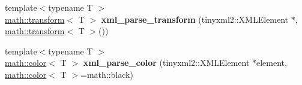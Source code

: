 \begin{DoxyCompactItemize}
\item 
\hypertarget{namespacemath_a47aa4c23b06657f4a08dc3330076a4dc}{
{\footnotesize template$<$typename T $>$ }\\\hyperlink{classmath_1_1transform}{math::transform}$<$ T $>$ {\bfseries xml\_\-parse\_\-transform} (tinyxml2::XMLElement $\ast$, \hyperlink{classmath_1_1transform}{math::transform}$<$ T $>$())}
\label{namespacemath_a47aa4c23b06657f4a08dc3330076a4dc}

\item 
\hypertarget{namespacemath_a22341528dfea412882791429a76cbb3e}{
{\footnotesize template$<$typename T $>$ }\\\hyperlink{classmath_1_1color}{math::color}$<$ T $>$ {\bfseries xml\_\-parse\_\-color} (tinyxml2::XMLElement $\ast$element, \hyperlink{classmath_1_1color}{math::color}$<$ T $>$=math::black)}
\label{namespacemath_a22341528dfea412882791429a76cbb3e}

\end{DoxyCompactItemize}
